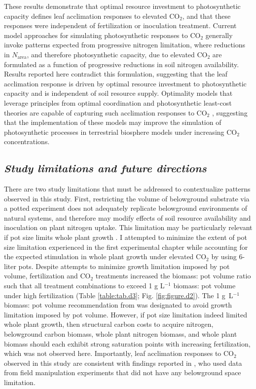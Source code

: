 These results demonstrate that optimal resource investment to photosynthetic capacity defines leaf acclimation responses to elevated CO$_2$, and that these responses were independent of fertilization or inoculation treatment. Current model approaches for simulating photosynthetic responses to CO$_2$ generally invoke patterns expected from progressive nitrogen limitation, where reductions in $N_\mathrm{area}$, and therefore photosynthetic capacity, due to elevated CO$_2$ are formulated as a function of progressive reductions in soil nitrogen availability. Results reported here contradict this formulation, suggesting that the leaf acclimation response is driven by optimal resource investment to photosynthetic capacity and is independent of soil resource supply. Optimality models that leverage principles from optimal coordination and photosynthetic least-cost theories  are capable of capturing such acclimation responses to CO$_2$ , suggesting that the implementation of these models may improve the simulation of photosynthetic processes in terrestrial biosphere models under increasing CO$_2$ concentrations.

\begin{singlespace}
    \subsection{\textit{Study limitations and future directions}}
\end{singlespace}
\noindent There are two study limitations that must be addressed to contextualize patterns observed in this study. First, restricting the volume of belowground substrate via a potted experiment does not adequately replicate belowground environments of natural systems, and therefore may modify effects of soil resource availability and inoculation on plant nitrogen uptake. This limitation may be particularly relevant if pot size limits whole plant growth . I attempted to minimize the extent of pot size limitation experienced in the first experimental chapter while accounting for the expected stimulation in whole plant growth under elevated CO$_2$ by using 6-liter pots. Despite attempts to minimize growth limitation imposed by pot volume, fertilization and CO$_2$ treatments increased the biomass: pot volume ratio such that all treatment combinations to exceed 1 g L$^{-1}$ biomass: pot volume under high fertilization (Table \ref{table:tab.d3}; Fig. \ref{fig:figure.d2}). The 1 g\ L$^{-1}$ biomass: pot volume recommendation from  was designated to avoid growth limitation imposed by pot volume. However, if pot size limitation indeed limited whole plant growth, then structural carbon costs to acquire nitrogen, belowground carbon biomass, whole plant nitrogen biomass, and whole plant biomass should each exhibit strong saturation points with increasing fertilization, which was not observed here.  Importantly, leaf acclimation responses to CO$_2$ observed in this study are consistent with findings reported in , who used data from field manipulation experiments that did not have any belowground space limitation.

